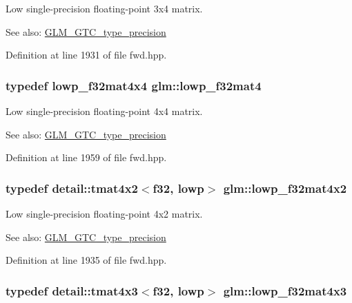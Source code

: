 Low single-precision floating-point 3x4 matrix. \begin{Desc}
\item[See also:]\hyperlink{group__gtc__type__precision}{GLM\_\-GTC\_\-type\_\-precision} \end{Desc}


Definition at line 1931 of file fwd.hpp.\hypertarget{group__gtc__type__precision_gda4d11f44b410c1be7b6b1d05ccf692c}{
\subsubsection[lowp\_\-f32mat4]{\setlength{\rightskip}{0pt plus 5cm}typedef lowp\_\-f32mat4x4 {\bf glm::lowp\_\-f32mat4}}}
\label{group__gtc__type__precision_gda4d11f44b410c1be7b6b1d05ccf692c}


Low single-precision floating-point 4x4 matrix. \begin{Desc}
\item[See also:]\hyperlink{group__gtc__type__precision}{GLM\_\-GTC\_\-type\_\-precision} \end{Desc}


Definition at line 1959 of file fwd.hpp.\hypertarget{group__gtc__type__precision_g6eedee3981e5bf150ad7463786d0d694}{
\subsubsection[lowp\_\-f32mat4x2]{\setlength{\rightskip}{0pt plus 5cm}typedef detail::tmat4x2$<$f32, lowp$>$ {\bf glm::lowp\_\-f32mat4x2}}}
\label{group__gtc__type__precision_g6eedee3981e5bf150ad7463786d0d694}


Low single-precision floating-point 4x2 matrix. \begin{Desc}
\item[See also:]\hyperlink{group__gtc__type__precision}{GLM\_\-GTC\_\-type\_\-precision} \end{Desc}


Definition at line 1935 of file fwd.hpp.\hypertarget{group__gtc__type__precision_gdd0ff5b09c6ecac83e4e908e3f6478c7}{
\subsubsection[lowp\_\-f32mat4x3]{\setlength{\rightskip}{0pt plus 5cm}typedef detail::tmat4x3$<$f32, lowp$>$ {\bf glm::lowp\_\-f32mat4x3}}}
\label{group__gtc__type__precision_gdd0ff5b09c6ecac83e4e908e3f6478c7}



